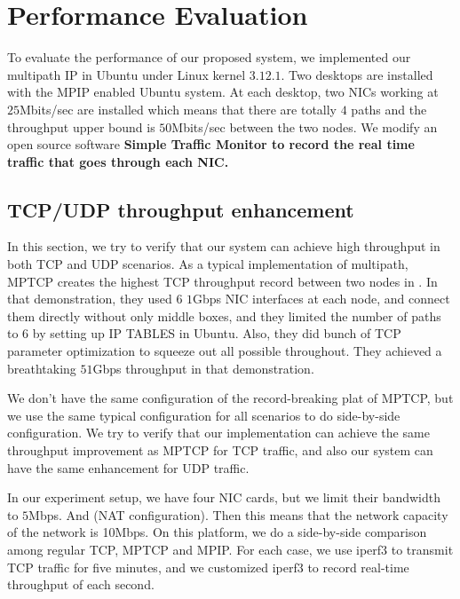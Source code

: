 \section{Performance Evaluation}
\label{sec:evaluation}
To evaluate the performance of our proposed system, we implemented our multipath IP in Ubuntu under Linux kernel $3.12.1$. Two desktops are installed with the MPIP enabled Ubuntu system. At each desktop, two NICs working at $25$Mbits/sec are installed which means that there are totally $4$ paths and the throughput upper bound is $50$Mbits/sec between the two nodes. We modify an open source software \bf{Simple Traffic Monitor}\cite{simon01} to record the real time traffic that goes through each NIC.


\subsection{TCP/UDP throughput enhancement}
\label{sec:tcp}

In this section, we try to verify that our system can achieve high throughput in both TCP and UDP scenarios. As a typical implementation of multipath, MPTCP creates the highest TCP throughput record between two nodes in \cite{record}. In that demonstration, they used $6$ $1$Gbps NIC interfaces at each node, and connect them directly without only middle boxes, and they limited the number of paths to $6$ by setting up IP TABLES in Ubuntu. Also, they did bunch of TCP parameter optimization to squeeze out all possible throughout. They achieved a breathtaking $51$Gbps throughput in that demonstration. 

We don't have the same configuration of the record-breaking plat of MPTCP, but we use the same typical configuration for all scenarios to do side-by-side configuration. We try to verify that our implementation can achieve the same throughput improvement as MPTCP for TCP traffic, and also our system can have the same enhancement for UDP traffic. 

In our experiment setup, we have four NIC cards, but we limit their bandwidth to $5$Mbps. And (NAT configuration). Then this means that the network capacity of the network is 10Mbps. On this platform, we do a side-by-side comparison among regular TCP, MPTCP and MPIP. For each case, we use iperf3 to transmit TCP traffic for five minutes, and we customized iperf3 to record real-time throughput of each second.

